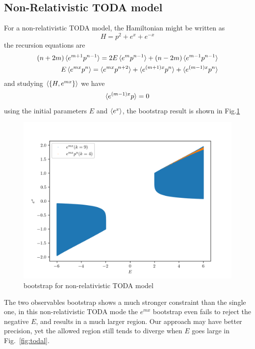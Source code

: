\documentclass[aps, preprint,amsmath, amssymb]{revtex4-2}
\begin{document}
\subsection{Non-Relativistic TODA model}
For a non-relativistic TODA model, the Hamiltonian might be written as
\begin{equation}
	H = p^2 + e^x + e^{-x}
\end{equation}
the recursion equations are
\begin{align}
	(n + 2m)\braket{e^{m + 1} p^{n - 1}} = 2E\braket{e^m p^{n - 1}} + (n - 2m)\braket{e^{m - 1} p^{n - 1}}\notag \\
	E\braket{e^{mx} p^n} = \braket{e^{mx} p^{n + 2}} + \braket{e^{(m + 1)x} p^n} + \braket{e^{(m - 1)x} p^n}
\end{align}
and studying $\braket{\{H, e^{mx}\}}$ we have
\begin{equation}
	\braket{e^{(m - 1)x} p} = 0
\end{equation}
using the initial parameters $E$ and $\braket{e^x}$, the bootstrap result is shown in Fig.\ref{fig:toda}
\begin{figure}
	\includegraphics[width=0.8\linewidth]{toda_compare.png}
	\caption{ bootstrap for non-relativistic TODA model}
	\label{fig:toda}
\end{figure}

The two observables bootstrap shows a much stronger constraint than the single one, in this non-relativistic TODA mode the $e^{mx}$ bootstrap even fails to reject the negative $E$, and results in a much larger region. Our approach may have better precision, yet the allowed region still tends to diverge when $E$ goes large in Fig.~\ref{fig:todal}.
\end{document}
